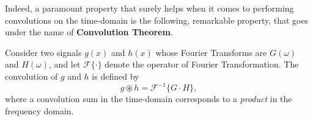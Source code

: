 \documentclass[\documentfontsize, twocolumn]{\classname}
\begin{document}
Indeed, a paramount property that surely helps when it comes to performing convolutions on the time-domain is the following, remarkable property, that goes under the name of \textbf{Convolution Theorem}.
\begin{thm}
    Consider two signals $g(x)$ and $h(x)$ whose Fourier Transforms are $G(\omega)$ and $H(\omega)$, and let $\mathcal F\{\cdot\}$ denote the operator of Fourier Transformation. The convolution of $g$ and $h$ is defined by
    \begin{equation}\label{eqn:convolutionTheorem}
        g \circledast h = \mathcal F^{-1}\{G \cdot H\},
    \end{equation}
    where a convolution sum in the time-domain corresponds to a \emph{product} in the frequency domain.
\end{thm}
\end{document}
